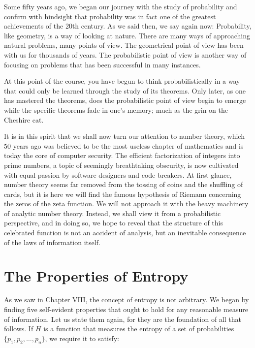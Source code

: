 \documentclass[12pt]{article}
\begin{document}
Some fifty years ago, we began our journey with the study of probability and confirm with hindsight that probability was in fact one of the greatest achievements of the 20th century. As we said then, we say again now: Probability, like geometry, is a way of looking at nature. There are many ways of approaching natural problems, many points of view. The geometrical point of view has been with us for thousands of years. The probabilistic point of view is another way of focusing on problems that has been successful in many instances. 

At this point of the course, you have begun to think probabilistically in a way that could only be learned through the study of its theorems. Only later, as one has mastered the theorems, does the probabilistic point of view begin to emerge while the specific theorems fade in one’s memory; much as the grin on the Cheshire cat.

It is in this spirit that we shall now turn our attention to number theory, which 50 years ago was believed to be the most useless chapter of mathematics and is today the core of computer security. The efficient factorization of integers into prime numbers, a topic of seemingly breathtaking obscurity, is now cultivated with equal passion by software designers and code breakers. At first glance, number theory seems far removed from the tossing of coins and the shuffling of cards, but it is here we will find the famous hypothesis of Riemann concerning the zeros of the zeta function. We will not approach it with the heavy machinery of analytic number theory. Instead, we shall view it from a probabilistic perspective, and in doing so, we hope to reveal that the structure of this celebrated function is not an accident of analysis, but an inevitable consequence of the laws of information itself.

\section{The Properties of Entropy}

As we saw in Chapter VIII, the concept of entropy is not arbitrary. We began by finding five self-evident properties that ought to hold for any reasonable measure of information. Let us state them again, for they are the foundation of all that follows. If $H$ is a function that measures the entropy of a set of probabilities $\{p_1, p_2, \dots, p_n\}$, we require it to satisfy:
\end{document}
